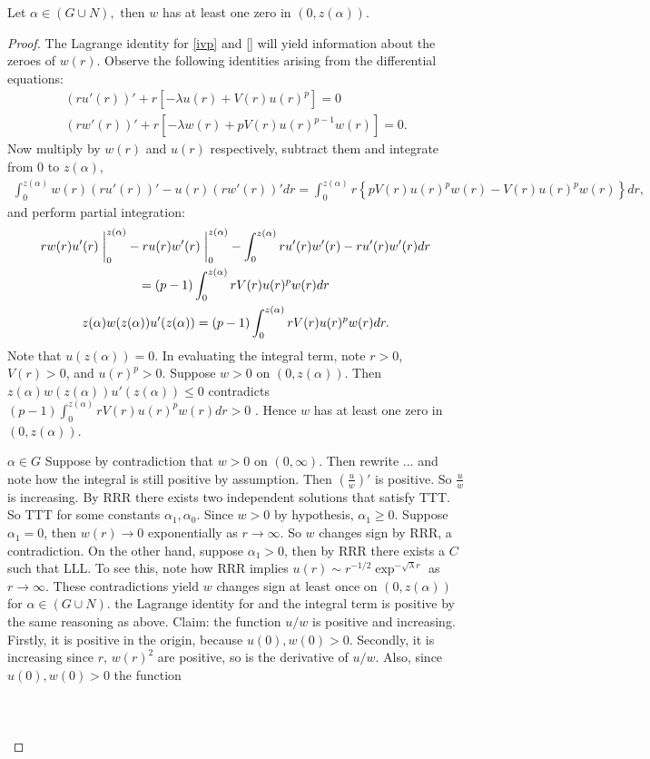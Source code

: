 \newpage
\begin{lemma}Let $\alpha\in (G\cup N),\text{ then }w$ has at least one zero in $(0,z(\alpha))$.
\begin{proof}
The Lagrange identity for \ref{ivp} and \ref{} will yield information about the zeroes of $w(r)$. Observe the following identities arising from the differential equations:\begin{gather*}
(ru'(r))'+r\left[-\lambda u(r)+V(r)u(r)^p\right]=0\\
(rw'(r))'+r\left[-\lambda w(r)+pV(r)u(r)^{p-1}w(r)\right]=0.
\end{gather*} Now multiply by $w(r)$ and $u(r)$ respectively, subtract them and integrate from 0 to $z(\alpha)$, \begin{gather*}
\int_0^{z(\alpha)}w(r)(ru'(r))'-u(r)(rw'(r))'dr=%
\int_0^{z(\alpha)}r\left\{pV(r)u(r)^pw(r)-V(r)u(r)^pw(r)\right\}dr,
\end{gather*} and perform partial integration:\begin{gather*}
rw(r)u'(r)\at_0^{z(\alpha)}-ru(r)w'(r)\at_0^{z(\alpha)}-\int_0^{z(\alpha)}ru'(r)w'(r)-ru'(r)w'(r)dr\\=(p-1)\int_0^{z(\alpha)}rV(r)u(r)^pw(r)dr\\z(\alpha)w(z(\alpha))u'(z(\alpha))=(p-1)\int_0^{z(\alpha)}rV(r)u(r)^pw(r)dr.
\end{gather*} Note that $u(z(\alpha))=0$.   In evaluating the integral term, {\color{gray}note $r>0$, $V(r)>0$, and $u(r)^p>0$. Suppose $w>0$ on $(0,z(\alpha))$. Then $z(\alpha)w(z(\alpha))u'(z(\alpha))\leq0$ contradicts $(p-1)\int_0^{z(\alpha)}rV(r)u(r)^pw(r)dr>0$ \Lightning. Hence $w$ has at least one zero in $(0,z(\alpha))$.}

\underline{$\alpha\in G$} Suppose by contradiction that $w>0$ on $(0,\infty)$. {\color{gray} Then rewrite ... and note how the integral is still positive by assumption. Then $\left(\frac{u}{w}\right)'$ is positive. So $\frac{u}{w}$ is increasing. By RRR there exists two independent solutions that satisfy TTT. So TTT for some constants $\alpha_1,\alpha_0$. Since $w>0$ by hypothesis, $\alpha_1\geq0$. Suppose $\alpha_1=0$, then $w(r)\to0$ exponentially as $r\to\infty$. So $w$ changes sign by RRR, a contradiction. On the other hand, suppose $\alpha_1>0$, then by RRR there exists a $C$ such that LLL. To see this, note how RRR implies $u(r)\sim r^{-1/2}\exp^{-\sqrt{\lambda}r}$ as $r\to\infty$. These contradictions yield $w$ changes sign at least once on $(0,z(\alpha))$ for $\alpha\in(G\cup N)$.} the Lagrange identity for and the integral term is positive by the same reasoning as above. Claim: the function $u/w$ is positive and increasing. Firstly, it is positive in the origin, because $u(0),w(0)>0$. Secondly, it is increasing since $r$, $w(r)^2$ are positive, so is the derivative of $u/w$. Also, since $u(0),w(0)>0$ the function \\ \\
\underline{}\\ \\
\underline{}
\end{proof}
\end{lemma}
